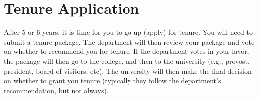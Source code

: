 \documentclass[oneside,11pt,dvipsnames]{book}
\begin{document}


\chapter{Tenure Application}

After 5 or 6 years, it is time for you to go up (apply) for tenure.  You will need to submit a tenure package.  The department will then review your package and vote on whether to recommend you for tenure.  If the department votes in your favor, the package will then go to the college, and then to the university (e.g., provost, president, board of visitors, etc).  The university will then make the final decision on whether to grant you tenure (typically they follow the department's recommendation, but not always).



\end{document}
